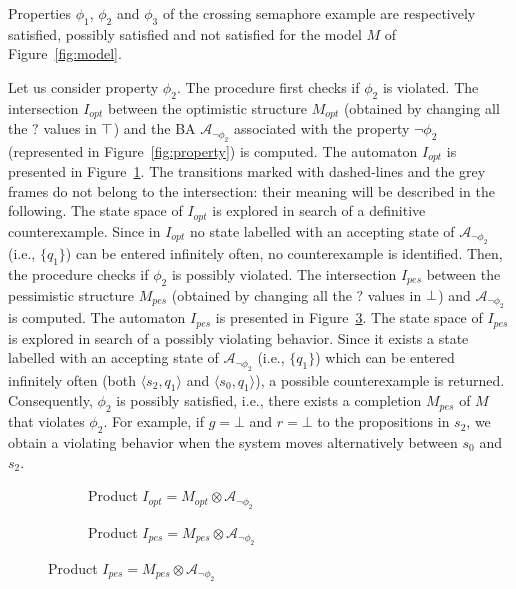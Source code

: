 Properties $\phi_1$, $\phi_2$ and $\phi_3$ of the crossing semaphore example are respectively satisfied, possibly satisfied and not satisfied for the model $M$ of Figure~\ref{fig:model}.

Let us consider property $\phi_2$. The procedure first checks if $\phi_2$ is violated.
The intersection $I_{opt}$  between the optimistic structure $M_{opt}$ (obtained by changing all the $?$ values in $\operatorname{\top}$) and the BA $\mathcal{A}_{\neg\phi_2}$ associated with the property $\neg \phi_2$ (represented in Figure~\ref{fig:property}) is computed.
The automaton $I_{opt}$ is presented in Figure~\ref{fig:productOpt}.
The transitions marked with dashed-lines and the grey frames do not belong to the intersection: their meaning will be described in the following.
The state space of  $I_{opt}$ is explored in search of a definitive counterexample. 
Since in $I_{opt}$ no state labelled with an accepting state of  $\mathcal{A}_{\lnot\phi_2}$ (i.e., $\{q_1\}$) can be entered infinitely often, no counterexample is identified.
Then, the procedure checks if $\phi_2$ is possibly violated.
The intersection $I_{pes}$ between the pessimistic structure $M_{pes}$ (obtained by changing all the $?$ values in $\operatorname{\bot}$) and $\mathcal{A}_{\neg\phi_2}$ is computed.
The automaton $I_{pes}$ is presented in Figure~\ref{fig:productPess}.
The state space of  $I_{pes}$ is explored in search of a possibly violating behavior.
Since it exists a state labelled with an accepting state of  $\mathcal{A}_{\lnot\phi_2}$ (i.e., $\{q_1\}$) which can be entered infinitely often (both $\langle s_2, q_1\rangle$ and $\langle s_0, q_1\rangle$), a possible counterexample is returned. 
Consequently, $\phi_2$ is possibly satisfied, i.e., there exists a completion $M_{pes}$ of $M$ that violates $\phi_2$.
For example, if $g=\bot$ and  $r=\bot$ to the propositions in $s_2$, we obtain a violating behavior when the system moves alternatively between $s_0$ and $s_2$. 




\begin{figure}[t]
\begin{minipage}[b]{.5\textwidth}
  \begin{figure}[H]
\centering

\caption{Product $I_{opt}=M_{opt}\otimes\mathcal{A}_{\lnot\phi_2}$}
\label{fig:productOpt}
 \end{figure}
\end{minipage}%
\begin{minipage}[b]{.5\textwidth}
  \begin{figure}[H]
\centering

\caption{Product $I_{pes}=M_{pes}\otimes\mathcal{A}_{\lnot\phi_2}$}
\label{fig:productPess}
 \end{figure}
\end{minipage}%
\end{figure}